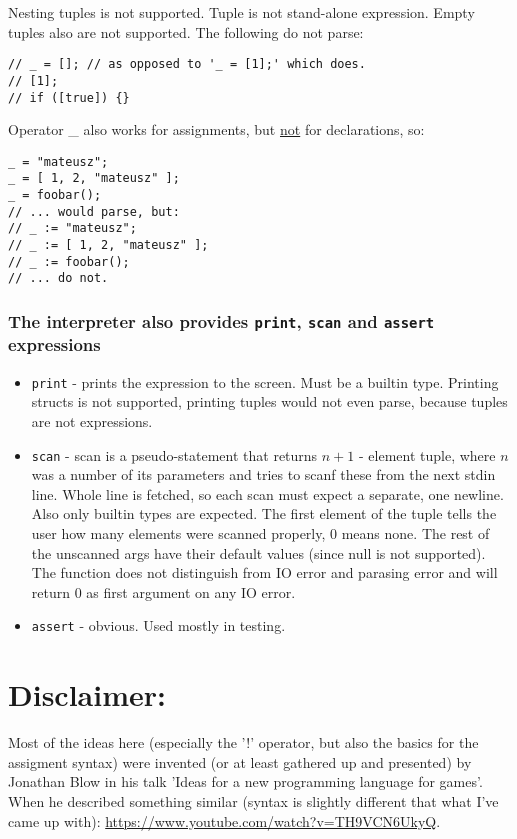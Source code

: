 \documentclass[11pt]{article}
\begin{document}
Nesting tuples is not supported. Tuple is not stand-alone expression. Empty
tuples also are not supported. The following do not parse:
\begin{verbatim}
// _ = []; // as opposed to '_ = [1];' which does.
// [1];
// if ([true]) {}
\end{verbatim}

Operator \_ also works for assignments, but \uline{not} for declarations, so:
\begin{verbatim}
_ = "mateusz";
_ = [ 1, 2, "mateusz" ];
_ = foobar();
// ... would parse, but:
// _ := "mateusz";
// _ := [ 1, 2, "mateusz" ];
// _ := foobar();
// ... do not.
\end{verbatim}

\subsubsection*{The interpreter also provides \texttt{print}, \texttt{scan} and \texttt{assert} expressions}
\label{sec:org35c6791}
\begin{itemize}
\item \texttt{print} - prints the expression to the screen. Must be a builtin
type. Printing structs is not supported, printing tuples would not even
parse, because tuples are not expressions.
\item \texttt{scan} - scan is a pseudo-statement that returns \(n+1\) - element
tuple, where \(n\) was a number of its parameters and tries to scanf these
from the next stdin line. Whole line is fetched, so each scan must expect
a separate, one newline. Also only builtin types are expected. The first
element of the tuple tells the user how many elements were scanned
properly, 0 means none. The rest of the unscanned args have their default
values (since null is not supported). The function does not distinguish
from IO error and parasing error and will return 0 as first argument on
any IO error.
\item \texttt{assert} - obvious. Used mostly in testing.
\end{itemize}

\section*{Disclaimer:}
\label{sec:orgba87c3f}
Most of the ideas here (especially the '!' operator, but also the basics for
the assigment syntax) were invented (or at least gathered up and presented) by
Jonathan Blow in his talk 'Ideas for a new programming language for
games'. When he described something similar (syntax is slightly different that
what I've came up with): \url{https://www.youtube.com/watch?v=TH9VCN6UkyQ}.
\end{document}
